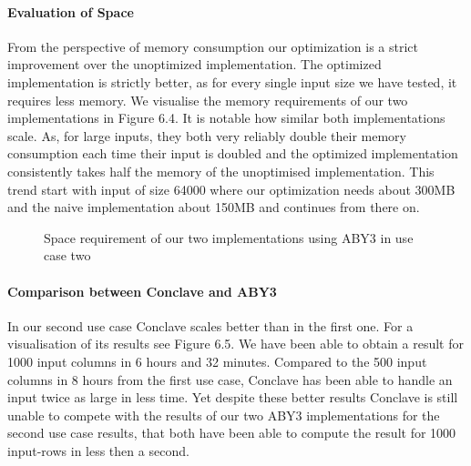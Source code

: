 \paragraph{Evaluation of Space}
From the perspective of memory consumption our optimization is a strict improvement over the unoptimized implementation.
The optimized implementation is strictly better, as for every single input size we have tested, it requires less memory. We visualise the memory requirements of our two implementations in Figure 6.4.
It is notable how similar both implementations scale. As, for large inputs, they both very reliably double their memory consumption each time their input is doubled and the optimized implementation consistently takes half the memory of the unoptimised implementation. This trend start with input of size 64000 where our optimization needs about 300MB and the naive implementation about 150MB and continues from there on.
\begin{figure}[H]
	\caption{Space requirement of our two implementations using ABY3 in use case two}
\end{figure}
\paragraph{Comparison between Conclave and ABY3}
In our second use case Conclave scales better than in the first one. For a visualisation of its results see Figure 6.5. We have been able to obtain a result for 1000 input columns in 6 hours and 32 minutes. Compared to the 500 input columns in 8 hours from the first use case, Conclave has been able to handle an input twice as large in less time. Yet despite these better results Conclave is still unable to compete with the results of our two ABY3 implementations for the second use case results, that both have been able to compute the result for 1000 input-rows in less then a second.

